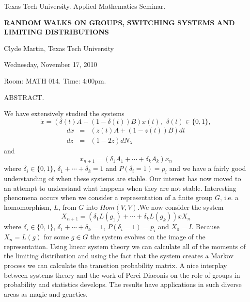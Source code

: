 \documentclass[oneside]{amsart}
\newcommand{\talktitle}{Random Walks on Groups,  Switching Systems and Limiting
 Distributions}
\newcommand{\talkspeaker}{Clyde Martin, Texas Tech University}
\newcommand{\talkdate}{Wednesday, November 17, 2010}
\newcommand{\talkabstract}{
We have extensively studied the systems
 $$\dot{x}=(\delta(t)A+(1-\delta(t))B)x(t),\ \
 \delta(t)\in\{0,1\},$$
 \begin{eqnarray*}dx&=&(z(t)A+(1-z(t))B)dt\\dz&=&(1-2z)dN_\lambda\end{eqnarray*}
 and $$x_{n+1}=(\delta_1A_1+\cdots+\delta_kA_k)x_n$$ where
 $\delta_i\in\{0,1\}$, $\delta_1+\cdots+\delta_k=1$ and $P(\delta_i=1)=p_i$ and we have
 a fairly good understanding of when these systems are stable. Our
 interest has now moved to an attempt to understand what happens
 when they are not stable. Interesting phenomena occurs when we
 consider a representation of a finite group $G$, i.e. a homomorphism, $L$, from $G$ into
 $Hom(V,V)$.We now consider the system $$X_{n+1}=(\delta_1L(g_1)+\cdots+\delta_kL(g_k))xX_n$$ where
 $\delta_i\in\{0,1\}$, $\delta_1+\cdots+\delta_k=1$,
 $P(\delta_i=1)=p_i$ and $X_0=I$.  Because $X_n=L(g)$ for some
 $g\in G$ the system evolves on the image of the representation.
 Using linear system theory we can calculate all of the moments
 of the limiting distribution and using the fact that the system
 creates a Markov process we can calculate the transition
 probability matrix. A nice interplay between systems theory and
 the work of Perci Diaconis on the role of groups in probability
 and statistics develops. The results  have applications in such
 diverse areas as magic and genetics.
}
\begin{document}
\thispagestyle{empty}

\begin{center}
Texas Tech University.  Applied Mathematics Seminar.

\end{center}

\begin{center}

\textbf{\LARGE {\uppercase{\talktitle}} }

\talkspeaker

\talkdate

Room: MATH 014.  Time: 4:00pm.

\end{center}

ABSTRACT.
\talkabstract
\end{document}
